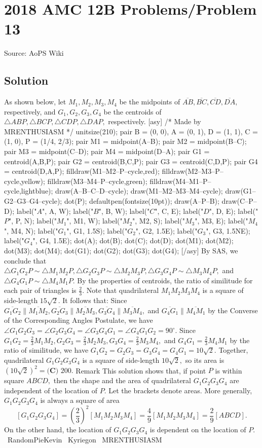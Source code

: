 \documentclass[12pt]{article}
\begin{document}
\section*{{2018 AMC 12B Problems/Problem 13}}
Source: AoPS Wiki

\subsection*{Solution}
As shown below, let $M_1,M_2,M_3,M_4$ be the midpoints of $\overline{AB},\overline{BC},\overline{CD},\overline{DA},$ respectively, and $G_1,G_2,G_3,G_4$ be the centroids of $\triangle{ABP},\triangle{BCP},\triangle{CDP},\triangle{DAP},$ respectively. [asy] /* Made by MRENTHUSIASM */ unitsize(210); pair B = (0, 0), A = (0, 1), D = (1, 1), C = (1, 0), P = (1/4, 2/3); pair M1 = midpoint(A--B); pair M2 = midpoint(B--C); pair M3 = midpoint(C--D); pair M4 = midpoint(D--A); pair G1 = centroid(A,B,P); pair G2 = centroid(B,C,P); pair G3 = centroid(C,D,P); pair G4 = centroid(D,A,P); filldraw(M1--M2--P--cycle,red); filldraw(M2--M3--P--cycle,yellow); filldraw(M3--M4--P--cycle,green); filldraw(M4--M1--P--cycle,lightblue); draw(A--B--C--D--cycle); draw(M1--M2--M3--M4--cycle); draw(G1--G2--G3--G4--cycle); dot(P); defaultpen(fontsize(10pt)); draw(A--P--B); draw(C--P--D); label("$A$", A, W); label("$B$", B, W); label("$C$", C, E); label("$D$", D, E); label("$P$", P, N); label("$M_1$", M1, W); label("$M_2$", M2, S); label("$M_3$", M3, E); label("$M_4$", M4, N); label("$G_1$", G1, 1.5S); label("$G_2$", G2, 1.5E); label("$G_3$", G3, 1.5NE); label("$G_4$", G4, 1.5E); dot(A); dot(B); dot(C); dot(D); dot(M1); dot(M2); dot(M3); dot(M4); dot(G1); dot(G2); dot(G3); dot(G4); [/asy] By SAS, we conclude that $\triangle G_1G_2P\sim\triangle M_1M_2P, \triangle G_2G_3P\sim\triangle M_2M_3P, \triangle G_3G_4P\sim\triangle M_3M_4P,$ and $\triangle G_4G_1P\sim\triangle M_4M_1P.$ By the properties of centroids, the ratio of similitude for each pair of triangles is $\frac{2}{3}.$ Note that quadrilateral $M_1M_2M_3M_4$ is a square of side-length $15\sqrt2.$ It follows that: Since $\overline{G_1G_2}\parallel\overline{M_1M_2},\overline{G_2G_3}\parallel\overline{M_2M_3},\overline{G_3G_4}\parallel\overline{M_3M_4},$ and $\overline{G_4G_1}\parallel\overline{M_4M_1}$ by the Converse of the Corresponding Angles Postulate, we have $\angle G_1G_2G_3=\angle G_2G_3G_4=\angle G_3G_4G_1=\angle G_4G_1G_2=90^\circ.$ Since $G_1G_2=\frac23M_1M_2, G_2G_3=\frac23M_2M_3, G_3G_4=\frac23M_3M_4,$ and $G_4G_1=\frac23M_4M_1$ by the ratio of similitude, we have $G_1G_2=G_2G_3=G_3G_4=G_4G_1=10\sqrt2.$ Together, quadrilateral $G_1G_2G_3G_4$ is a square of side-length $10\sqrt2,$ so its area is $\left(10\sqrt2\right)^2=\boxed{\textbf{(C) }200}.$ Remark This solution shows that, if point $P$ is within square $ABCD,$ then the shape and the area of quadrilateral $G_1G_2G_3G_4$ are independent of the location of $P.$ Let the brackets denote areas. More generally, $G_1G_2G_3G_4$ is always a square of area \[[G_1G_2G_3G_4]=\left(\frac23\right)^2[M_1M_2M_3M_4]=\frac49[M_1M_2M_3M_4]=\frac29[ABCD].\] On the other hand, the location of $G_1G_2G_3G_4$ is dependent on the location of $P.$ ~RandomPieKevin ~Kyriegon ~MRENTHUSIASM
\end{document}
